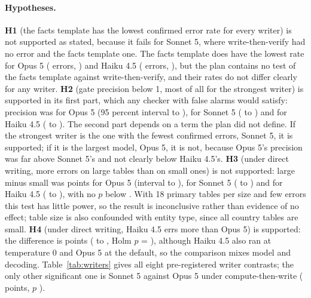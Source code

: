 \documentclass[11pt]{article}
\begin{document}
\paragraph{Hypotheses.} \textbf{H1} (the facts template has the lowest confirmed error rate for every writer) is not supported as stated, because it fails for Sonnet 5, where write-then-verify had no error and the facts template one. The facts template does have the lowest rate for Opus 5 (\ConfNOpusFour{} errors, \ConfOpusFour{}) and Haiku 4.5 (\ConfNHaikuFour{} errors, \ConfHaikuFour{}), but the plan contains no test of the facts template against write-then-verify, and their rates do not differ clearly for any writer. \textbf{H2} (gate precision below 1, most of all for the strongest writer) is supported in its first part, which any checker with false alarms would satisfy: precision was \PrecOpus{} for Opus 5 (95 percent interval \PrecLoOpus{} to \PrecHiOpus{}), \PrecSonnet{} for Sonnet 5 (\PrecLoSonnet{} to \PrecHiSonnet{}) and \PrecHaiku{} for Haiku 4.5 (\PrecLoHaiku{} to \PrecHiHaiku{}). The second part depends on a term the plan did not define. If the strongest writer is the one with the fewest confirmed errors, Sonnet 5, it is supported; if it is the largest model, Opus 5, it is not, because Opus 5's precision was far above Sonnet 5's and not clearly below Haiku 4.5's. \textbf{H3} (under direct writing, more errors on large tables than on small ones) is not supported: large minus small was \SizeOpus{} points for Opus 5 (interval \SizeLoOpus{} to \SizeHiOpus{}), \SizeSonnet{} for Sonnet 5 (\SizeLoSonnet{} to \SizeHiSonnet{}) and \SizeHaiku{} for Haiku 4.5 (\SizeLoHaiku{} to \SizeHiHaiku{}), with no $p$ below \SizePSonnet{}. With 18 primary tables per size and few errors this test has little power, so the result is inconclusive rather than evidence of no effect; table size is also confounded with entity type, since all country tables are small. \textbf{H4} (under direct writing, Haiku 4.5 errs more than Opus 5) is supported: the difference is \ModelDiffHaikuOne{} points (\ModelDiffLoHaikuOne{} to \ModelDiffHiHaikuOne{}, Holm $p$ = \ModelDiffPHaikuOne{}), although Haiku 4.5 also ran at temperature 0 and Opus 5 at the default, so the comparison mixes model and decoding. Table~\ref{tab:writers} gives all eight pre-registered writer contrasts; the only other significant one is Sonnet 5 against Opus 5 under compute-then-write (\ModelDiffSonnetTwo{} points, $p$ \ModelDiffPSonnetTwo{}).

\begin{table}[t]
\centering
\caption{All pre-registered writer contrasts in the confirmed error rate, primary set: each writer minus Opus 5 within a strategy, in percentage points, with 95 percent intervals from resampling tables and Holm-corrected $p$ values.}
\label{tab:writers}

\end{table}
\end{document}
